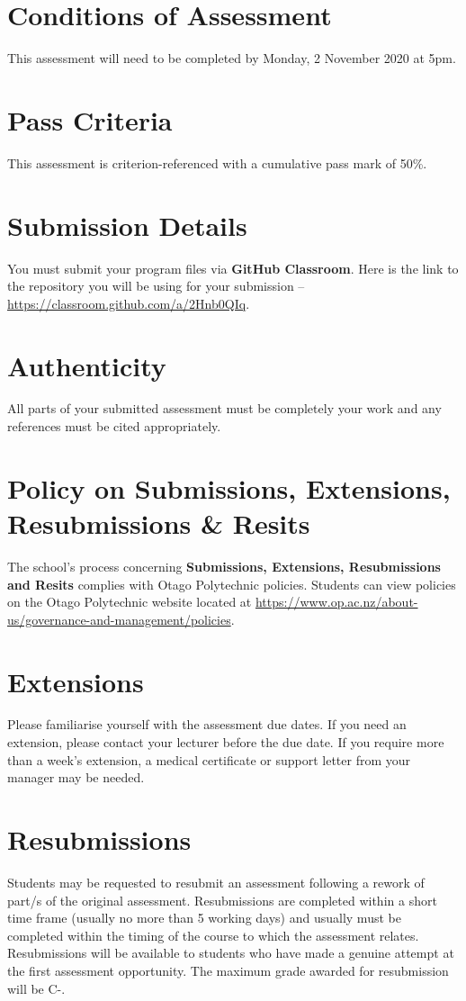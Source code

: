 \documentclass{article}
\begin{document}
\section*{Conditions of Assessment}
This assessment will need to be completed by Monday, 2 November 2020 at 5pm.

\section*{Pass Criteria}
This assessment is criterion-referenced with a cumulative pass mark of 50\%.

\section*{Submission Details}
You must submit your program files via \textbf{GitHub Classroom}. Here is the link to the repository you will be using for your submission – \href{https://classroom.github.com/a/2Hnb0QIq}{https://classroom.github.com/a/2Hnb0QIq}.

\section*{Authenticity}
All parts of your submitted assessment must be completely your work and any references must be cited appropriately.

\section*{Policy on Submissions, Extensions, Resubmissions \& Resits}
The school's process concerning \textbf{Submissions, Extensions, Resubmissions and Resits} complies with Otago Polytechnic policies. Students can view policies on the Otago Polytechnic website located at \href{https://www.op.ac.nz/about-us/governance-and-management/policies}{https://www.op.ac.nz/about-us/governance-and-management/policies}.

\section*{Extensions}
Please familiarise yourself with the assessment due dates. If you need an extension, please contact your lecturer before the due date. If you require more than a week's extension, a medical certificate or support letter from your manager may be needed.

\section*{Resubmissions}
Students may be requested to resubmit an assessment following a rework of part/s of the original assessment. Resubmissions are completed within a short time frame (usually no more than 5 working days) and usually must be completed within the timing of the course to which the assessment relates. Resubmissions will be available to students who have made a genuine attempt at the first assessment opportunity. The maximum grade awarded for resubmission will be C-.
\end{document}
